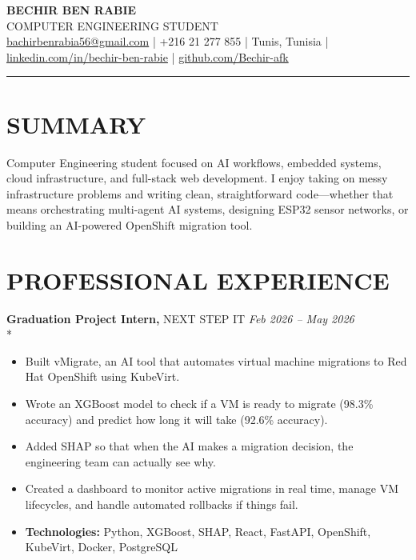 \documentclass[10pt,letterpaper]{article}
\newcommand{\experienceItem}[4]{%
    \textbf{#1,} #2 \hfill \textit{#3 -- #4}\\*%
}
\begin{document}
{\fontsize{24.5pt}{29pt}\selectfont\textbf{BECHIR BEN RABIE}}\\[2pt]
{\fontsize{11pt}{13pt}\selectfont COMPUTER ENGINEERING STUDENT}\\[2pt]
{\fontsize{10pt}{12pt}\selectfont
    \href{mailto:bachirbenrabia56@gmail.com}{bachirbenrabia56@gmail.com} | +216 21 277 855 | Tunis, Tunisia | \href{https://linkedin.com/in/bechir-ben-rabie}{linkedin.com/in/bechir-ben-rabie} | \href{https://github.com/Bechir-afk}{github.com/Bechir-afk}
}

\vspace{2pt}
\noindent\rule{\textwidth}{0.4pt}

\section*{SUMMARY}

Computer Engineering student focused on AI workflows, embedded systems, cloud infrastructure, and full-stack web development. I enjoy taking on messy infrastructure problems and writing clean, straightforward code—whether that means orchestrating multi-agent AI systems, designing ESP32 sensor networks, or building an AI-powered OpenShift migration tool.

\section*{PROFESSIONAL EXPERIENCE}

\experienceItem{Graduation Project Intern}{NEXT STEP IT}{Feb 2026}{May 2026}
\begin{itemize}[leftmargin=*, noitemsep, topsep=0pt]
    \item Built vMigrate, an AI tool that automates virtual machine migrations to Red Hat OpenShift using KubeVirt.
    \item Wrote an XGBoost model to check if a VM is ready to migrate (98.3\% accuracy) and predict how long it will take (92.6\% accuracy).
    \item Added SHAP so that when the AI makes a migration decision, the engineering team can actually see why.
    \item Created a dashboard to monitor active migrations in real time, manage VM lifecycles, and handle automated rollbacks if things fail.
    \item \textbf{Technologies:} Python, XGBoost, SHAP, React, FastAPI, OpenShift, KubeVirt, Docker, PostgreSQL
\end{itemize}
\vspace{4pt}
\end{document}
